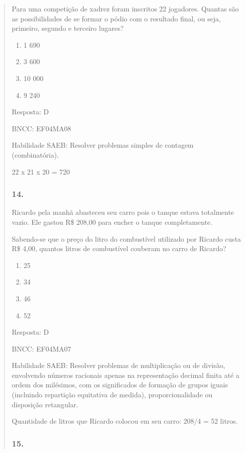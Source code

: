 \begin{enumerate}
\begin{escolha}
\begin{enumerate}
\begin{itemize}
\begin{itemize}
\begin{escolha}
\begin{quote}
\begin{escolha}
{Para uma competição de xadrez foram inscritos 22 jogadores. Quantas são
as possibilidades de se formar o pódio com o resultado final, ou seja,
primeiro, segundo e terceiro lugares?

\begin{enumerate}
\def\labelenumi{\alph{enumi})}
\item
  1 690
\item
  3 600
\item
  10 000
\item
  9 240
\end{enumerate}

Resposta: D

BNCC: EF04MA08

Habilidade SAEB: Resolver problemas simples de contagem (combinatória).

22 x 21 x 20 = 720

\subsubsection{14.}\label{section-170}

Ricardo pela manhã abasteceu seu carro pois o tanque estava totalmente
vazio. Ele gastou R\$ 208,00 para encher o tanque completamente.

Sabendo-se que o preço do litro do combustível utilizado por Ricardo
custa R\$ 4,00, quantos litros de combustível couberam no carro de
Ricardo?

\begin{enumerate}
\def\labelenumi{\alph{enumi})}
\item
  25
\item
  34
\item
  46
\item
  52
\end{enumerate}

Resposta: D

BNCC: EF04MA07

Habilidade SAEB: Resolver problemas de multiplicação ou de divisão,
envolvendo números racionais apenas na representação decimal finita até
a ordem dos milésimos, com os significados de formação de grupos iguais
(incluindo repartição equitativa de medida), proporcionalidade ou
disposição retangular.

Quantidade de litros que Ricardo colocou em seu carro: 208/4 = 52
litros.

\subsubsection{15.}\label{section-171}

}
\end{escolha}
\end{quote}
\end{escolha}
\end{itemize}
\end{itemize}
\end{enumerate}
\end{escolha}
\end{enumerate}
